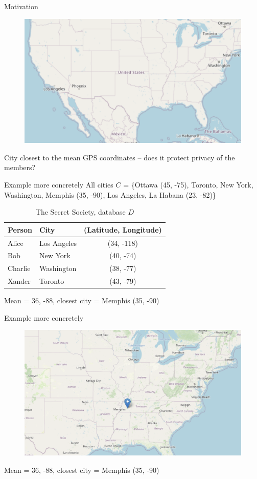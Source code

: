 \documentclass[12pt,aspectratio=169,handout]{beamer}
\begin{document}
\begin{frame}{Motivation}
\begin{figure}
\includegraphics[width=0.8\linewidth]{img/osm1.png}
\end{figure}
City closest to the mean GPS coordinates -- does it protect privacy of the members?
\end{frame}


\begin{frame}{Example more concretely}
All cities $C$ = \{Ottawa (45, -75), Toronto, New York, Washington, Memphis (35, -90), Los Angeles, La Habana (23, -82)\}

\begin{table}
\scriptsize
\begin{tabular}{llc}
\toprule
Person & City & (Latitude, Longitude)\\ \midrule
Alice & Los Angeles & (34, -118) \\
Bob & New York & (40, -74) \\
Charlie & Washington & (38, -77) \\
Xander & Toronto & (43, -79) \\ \bottomrule
\end{tabular}
\caption{The Secret Society, database $D$}
\end{table}

Mean = 36, -88, closest city = Memphis (35, -90)

\end{frame}


\begin{frame}{Example more concretely}

\begin{figure}
\includegraphics[width=0.8\linewidth]{img/osm2.png}
\end{figure}
Mean = 36, -88, closest city = Memphis (35, -90)

\end{frame}
\end{document}
